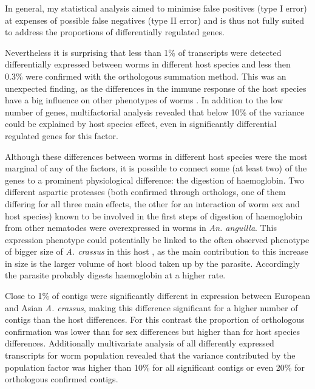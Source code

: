 \documentclass[10pt]{article}
\begin{document}
In general, my statistical analysis aimed to minimise false positives
(type I error) at expenses of possible false negatives (type II error)
and is thus not fully suited to address the proportions of
differentially regulated genes.

Nevertheless it is surprising that less than 1\% of transcripts were
detected differentially expressed between worms in different host
species and less then 0.3\% were confirmed with the orthologous
summation method. This was an unexpected finding, as the differences
in the immune response of the host species have a big influence on
other phenotypes of worms \cite{knopf_swimbladder_2006}. In addition
to the low number of genes, multifactorial analysis revealed that
below 10\% of the variance could be explained by host species effect,
even in significantly differential regulated genes for this factor.

Although these differences between worms in different host species
were the most marginal of any of the factors, it is possible to
connect some (at least two) of the genes to a prominent physiological
difference: the digestion of haemoglobin. Two different aspartic
proteases (both confirmed through orthologs, one of them differing for
all three main effects, the other for an interaction of worm sex and
host species) known to be involved in the first steps of digestion of
haemoglobin from other nematodes \cite{pmid12782060} were
overexpressed in worms in \textit{An. anguilla}. This expression
phenotype could potentially be linked to the often observed phenotype
of bigger size of \textit{A. crassus} in this host
\cite{knopf_swimbladder_2006}, as the main contribution to this
increase in size is the larger volume of host blood taken up by the
parasite. Accordingly the parasite probably digests haemoglobin at a
higher rate.

Close to 1\% of contigs were significantly different in expression
between European and Asian \textit{A. crassus}, making this difference
significant for a higher number of contigs than the host
differences. For this contrast the proportion of orthologous
confirmation was lower than for sex differences but higher than for
host species differences. Additionally multivariate analysis of all
differently expressed transcripts for worm population revealed that
the variance contributed by the population factor was higher than 10\%
for all significant contigs or even 20\% for orthologous confirmed
contigs.
\end{document}
